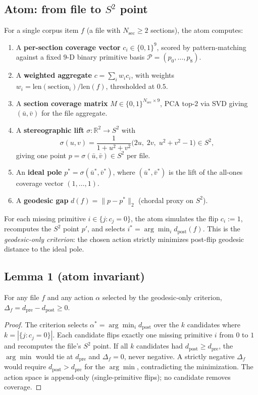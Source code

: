 \documentclass[11pt,a4paper]{article}
\begin{document}
\subsection{Atom: from file to $S^2$ point}
For a single corpus item $f$ (a file with $N_{\mathrm{sec}} \geq 2$ sections), the atom computes:
\begin{enumerate}
\item A \textbf{per-section coverage vector} $c_i \in \{0,1\}^9$, scored by pattern-matching against a fixed $9$-D binary primitive basis $\mathcal{P} = (p_0, \ldots, p_8)$.
\item A \textbf{weighted aggregate} $c = \sum_i w_i c_i$, with weights $w_i = \mathrm{len}(\mathrm{section}_i) / \mathrm{len}(f)$, thresholded at $0.5$.
\item A \textbf{section coverage matrix} $M \in \{0,1\}^{N_{\mathrm{sec}} \times 9}$, PCA top-$2$ via SVD giving $(\bar u, \bar v)$ for the file aggregate.
\item A \textbf{stereographic lift} $\sigma: \mathbb{R}^2 \to S^2$ with
\begin{equation}
\sigma(u,v) = \frac{1}{1+u^2+v^2}\big(2u,\; 2v,\; u^2+v^2-1\big) \in S^2,
\label{eq:stereographic}
\end{equation}
giving one point $p = \sigma(\bar u, \bar v) \in S^2$ per file.
\item An \textbf{ideal pole} $p^* = \sigma(\bar u^*, \bar v^*)$, where $(\bar u^*, \bar v^*)$ is the lift of the all-ones coverage vector $(1,\dots,1)$.
\item A \textbf{geodesic gap} $d(f) = \|p - p^*\|_2$ (chordal proxy on $S^2$).
\end{enumerate}
For each missing primitive $i \in \{j : c_j = 0\}$, the atom simulates the flip $c_i := 1$, recomputes the $S^2$ point $p'$, and selects $i^* = \arg\min_i d_{\mathrm{post}}(f)$. This is the \emph{geodesic-only criterion}: the chosen action strictly minimizes post-flip geodesic distance to the ideal pole.

\subsection{Lemma 1 (atom invariant)}
\begin{lemma}
For any file $f$ and any action $\alpha$ selected by the geodesic-only criterion, $\Delta_f = d_{\mathrm{pre}} - d_{\mathrm{post}} \geq 0$.
\end{lemma}

\begin{proof}
The criterion selects $\alpha^* = \arg\min_i d_{\mathrm{post}}$ over the $k$ candidates where $k = |\{j : c_j = 0\}|$. Each candidate flips exactly one missing primitive $i$ from $0$ to $1$ and recomputes the file's $S^2$ point. If all $k$ candidates had $d_{\mathrm{post}} \geq d_{\mathrm{pre}}$, the $\arg\min$ would tie at $d_{\mathrm{pre}}$ and $\Delta_f = 0$, never negative. A strictly negative $\Delta_f$ would require $d_{\mathrm{post}} > d_{\mathrm{pre}}$ for the $\arg\min$, contradicting the minimization. The action space is append-only (single-primitive flips); no candidate removes coverage.
\end{proof}
\end{document}
